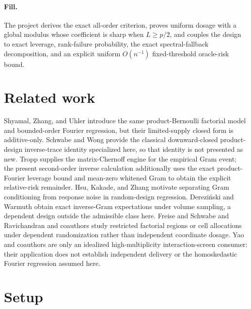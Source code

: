 \documentclass{article}
\begin{document}
\paragraph{Fill.} The project derives the exact all-order criterion, proves uniform dosage with a global modulus whose coefficient is sharp when \(L\ge p/2\), and couples the design to exact leverage, rank-failure probability, the exact spectral-fallback decomposition, and an explicit uniform \(O(n^{-1})\) fixed-threshold oracle-risk bound.

\section{Related work}

Shyamal, Zhang, and Uhler introduce the same product-Bernoulli factorial model and bounded-order Fourier regression, but their limited-supply closed form is additive-only. Schwabe and Wong provide the classical downward-closed product-design inverse-trace identity specialized here, so that identity is not presented as new. Tropp supplies the matrix-Chernoff engine for the empirical Gram event; the present second-order inverse calculation additionally uses the exact product-Fourier leverage bound and mean-zero whitened Gram to obtain the explicit relative-risk remainder. Hsu, Kakade, and Zhang motivate separating Gram conditioning from response noise in random-design regression. Dereziński and Warmuth obtain exact inverse-Gram expectations under volume sampling, a dependent design outside the admissible class here. Freise and Schwabe and Ravichandran and coauthors study restricted factorial regions or cell allocations under dependent randomization rather than independent coordinate dosage. Yao and coauthors are only an idealized high-multiplicity interaction-screen consumer: their application does not establish independent delivery or the homoskedastic Fourier regression assumed here.

\section{Setup}
\end{document}
